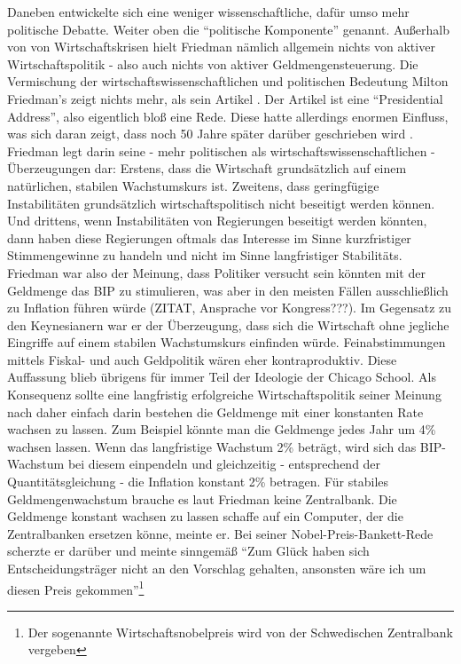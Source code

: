 Daneben entwickelte sich eine weniger wissenschaftliche, dafür umso mehr politische Debatte. Weiter oben die "`politische Komponente"' genannt. Außerhalb von von Wirtschaftskrisen hielt Friedman nämlich allgemein nichts von aktiver Wirtschaftspolitik - also auch nichts von aktiver Geldmengensteuerung. Die Vermischung der wirtschaftswissenschaftlichen und politischen Bedeutung Milton Friedman's zeigt nichts mehr, als sein Artikel \textcite{Friedman1968}. Der Artikel ist eine "`Presidential Address"', also eigentlich bloß eine Rede. Diese hatte allerdings enormen Einfluss, was sich daran zeigt, dass noch 50 Jahre später darüber geschrieben wird \parencite{Mankiw2018}. Friedman legt darin seine - mehr politischen als wirtschaftswissenschaftlichen -  Überzeugungen dar: Erstens, dass die Wirtschaft grundsätzlich auf einem natürlichen, stabilen Wachstumskurs ist. Zweitens, dass geringfügige Instabilitäten grundsätzlich wirtschaftspolitisch nicht beseitigt werden können. Und drittens, wenn Instabilitäten von Regierungen beseitigt werden könnten, dann haben diese Regierungen oftmals das Interesse im Sinne kurzfristiger Stimmengewinne zu handeln und nicht im Sinne langfristiger Stabilitäts. Friedman war also der Meinung, dass Politiker versucht sein könnten mit der Geldmenge das BIP zu stimulieren, was aber in den meisten Fällen ausschließlich zu Inflation führen würde (ZITAT, Ansprache vor Kongress???). Im Gegensatz zu den Keynesianern war er der Überzeugung, dass sich die Wirtschaft ohne jegliche Eingriffe auf einem stabilen Wachstumskurs einfinden würde. Feinabstimmungen mittels Fiskal- und auch Geldpolitik wären eher kontraproduktiv. Diese Auffassung blieb übrigens für immer Teil der Ideologie der Chicago School. Als Konsequenz sollte eine langfristig erfolgreiche Wirtschaftspolitik seiner Meinung nach daher einfach darin bestehen die Geldmenge mit einer konstanten Rate wachsen zu lassen. Zum Beispiel könnte man die Geldmenge jedes Jahr um 4\% wachsen lassen. Wenn das langfristige Wachstum 2\% beträgt, wird sich das BIP-Wachstum bei diesem einpendeln und gleichzeitig - entsprechend der Quantitätsgleichung - die Inflation konstant 2\% betragen. Für stabiles Geldmengenwachstum brauche es laut Friedman keine Zentralbank. Die Geldmenge konstant wachsen zu lassen schaffe auf ein Computer, der die Zentralbanken ersetzen könne, meinte er. Bei seiner Nobel-Preis-Bankett-Rede \parencite{Friedman1976b} scherzte er darüber und meinte sinngemäß "`Zum Glück haben sich Entscheidungsträger nicht an den Vorschlag gehalten, ansonsten wäre ich um diesen Preis gekommen"'\footnote{Der sogenannte Wirtschaftsnobelpreis wird von der Schwedischen Zentralbank vergeben}



